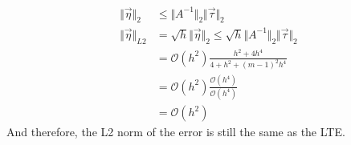 \documentclass[]{article}
\begin{document}
        \begin{align*}\tag{2.b.5}\label{eqn:2.b.5}
            \Vert \vec{\eta}\Vert_2 &\le 
            \Vert A^{-1}\Vert_2\Vert \vec{\tau}\Vert_2
            \\
            \Vert \vec{\eta}\Vert_{L2} &= 
            \sqrt{h}\Vert \vec{\eta}\Vert_2\le 
            \sqrt{h}\Vert A^{-1}\Vert_2\Vert \vec{\tau}\Vert_2
            \\
            &= 
            \mathcal{O}(h^2)\frac{h^2 + 4h^4}{4 + h^2+ (m - 1)^2h^4}
            \\
            &= 
            \mathcal{O}(h^2)\frac{\mathcal{O}(h^4)}{\mathcal{O}(h^4)}
            \\
            &= \mathcal{O}(h^2)
        \end{align*}
        And therefore, the L2 norm of the error is still the same as the LTE. 
\end{document}
